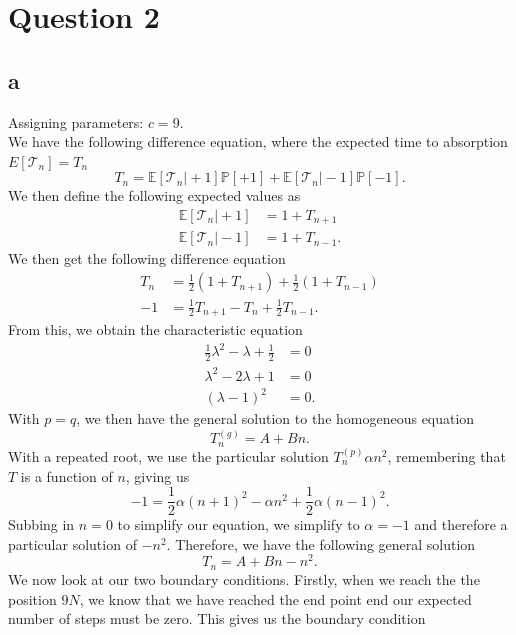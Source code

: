 \documentclass{article}
\newcommand{\Prob}{\mathbb{P}}
\newcommand{\E}{\mathbb{E}}
\begin{document}
\pagebreak
\section{Question 2}
\subsection{a}
Assigning parameters: $c=9$.\\
We have the following difference equation, where the expected time to absorption $E[\mathcal{T}_n]=T_n$
\begin{equation}
    T_n = \E[\mathcal{T}_n\vert +1]\Prob[+1] + \E[\mathcal{T}_n\vert -1]\Prob[-1].
\end{equation}
We then define the following expected values as
\begin{align}
    \E[\mathcal{T}_n\vert+1] &= 1+T_{n+1} \\
    \E[\mathcal{T}_n\vert-1] &= 1+T_{n-1} .
\end{align}
We then get the following difference equation
\begin{align}
    T_n &= \frac{1}{2}(1+T_{n+1}) + \frac{1}{2}(1+T_{n-1}) \\
    -1 &= \frac{1}{2}T_{n+1} -T_n + \frac{1}{2}T_{n-1}.
\end{align}
From this, we obtain the characteristic equation
\begin{align}
    \frac{1}{2}\lambda^2 -\lambda +\frac{1}{2} &= 0 \\
    \lambda^2 -2\lambda +1 &= 0\\
    (\lambda-1)^2 &= 0.
\end{align}
With $p=q$, we then have the general solution to the homogeneous equation 
\begin{equation}
    T_n^{(g)}=A+Bn.
\end{equation}
With a repeated root, we use the particular solution $T_n^{(p)}\alpha n^2$, remembering that $T$ is a function of $n$, giving us
\begin{equation}
    -1 = \frac{1}{2}\alpha(n+1)^2 - \alpha n^2 + \frac{1}{2}\alpha(n-1)^2. 
\end{equation}
Subbing in $n=0$ to simplify our equation, we simplify to $\alpha=-1$ and therefore a particular solution of $-n^2$. Therefore, we have the following general solution
\begin{equation}
    T_n = A+Bn-n^2.
\end{equation}
We now look at our two boundary conditions. Firstly, when we reach the the position $9N$, we know that we have reached the end point end our expected number of steps must be zero. This gives us the boundary condition
\end{document}

